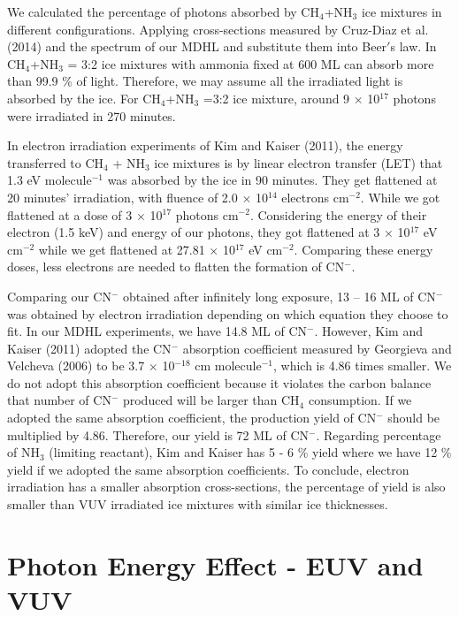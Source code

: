 We calculated the percentage of photons absorbed by CH$_4$+NH$_3$ ice mixtures in different configurations. Applying cross-sections measured by Cruz-Diaz et al. (2014) and the spectrum of our MDHL and substitute them into Beer$'$s law. In CH$_4$+NH$_3$ = 3:2 ice mixtures with ammonia fixed at 600 ML can absorb more than 99.9 \% of light. Therefore, we may assume all the irradiated light is absorbed by the ice. For CH$_4$+NH$_3$ =3:2 ice mixture, around 9 $\times$ 10$^{17}$ photons were irradiated in 270 minutes.

In electron irradiation experiments of Kim and Kaiser (2011)\cite{kim}, the energy transferred to CH$_4$ + NH$_3$ ice mixtures is by linear electron transfer (LET) that 1.3 eV molecule$^{-1}$ was absorbed by the ice in 90 minutes. They get flattened at 20 minutes’ irradiation, with fluence of 2.0 $\times$ 10$^{14}$ electrons cm$^{-2}$. While we got flattened at a dose of 3 $\times$ 10$^{17}$ photons cm$^{-2}$. Considering the energy of their electron (1.5 keV) and energy of our photons, they got flattened at 3 $\times$ 10$^{17}$ eV cm$^{-2}$ while we get flattened at 27.81 $\times$ 10$^{17}$ eV cm$^{-2}$. Comparing these energy doses, less electrons are needed to flatten the formation of CN$^-$.

Comparing our CN$^-$ obtained after infinitely long exposure, 13 – 16 ML of CN$^-$ was obtained by electron irradiation depending on which equation they choose to fit. In our MDHL experiments, we have 14.8 ML of CN$^-$. However, Kim and Kaiser (2011) adopted the CN$^-$ absorption coefficient measured by Georgieva and Velcheva (2006) to be 3.7 $\times$ 10$^{-18}$ cm molecule$^{-1}$, which is 4.86 times smaller. We do not adopt this absorption coefficient because it violates the carbon balance that number of CN$^-$ produced will be larger than CH$_4$ consumption. If we adopted the same absorption coefficient, the production yield of CN$^-$ should be multiplied by 4.86. Therefore, our yield is 72 ML of CN$^-$. Regarding percentage of NH$_3$ (limiting reactant), Kim and Kaiser has 5 - 6 \% yield where we have 12 \% yield if we adopted the same absorption coefficients. To conclude, electron irradiation has a smaller absorption cross-sections, the percentage of yield is also smaller than VUV irradiated ice mixtures with similar ice thicknesses.




\section{Photon Energy Effect - EUV and VUV}

